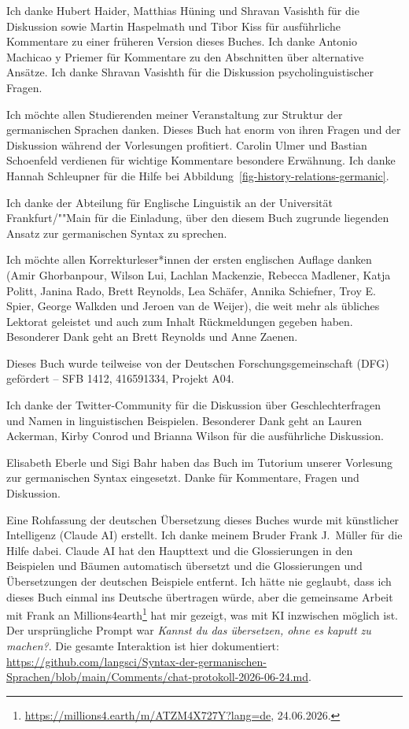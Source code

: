 \addchap{\lsAcknowledgementTitle}

Ich danke Hubert Haider, Matthias Hüning und Shravan Vasishth für die Diskussion sowie Martin Haspelmath und Tibor Kiss für ausführliche Kommentare
zu einer früheren Version dieses Buches. Ich danke Antonio Machicao y Priemer für Kommentare zu den Abschnitten
über alternative Ansätze. Ich danke Shravan Vasishth für die Diskussion psycholinguistischer Fragen.

Ich möchte allen Studierenden meiner Veranstaltung zur Struktur der germanischen Sprachen danken. Dieses Buch
hat enorm von ihren Fragen und der Diskussion während der Vorlesungen profitiert.
Carolin Ulmer %
und
Bastian Schoenfeld %
verdienen für wichtige Kommentare besondere Erwähnung. Ich danke Hannah Schleupner für die Hilfe bei Abbildung~\ref{fig-history-relations-germanic}.

Ich danke der Abteilung für Englische Linguistik an der Universität Frankfurt/""Main für die Einladung, über
den diesem Buch zugrunde liegenden Ansatz zur germanischen Syntax zu sprechen.

Ich möchte allen Korrekturleser*innen der ersten englischen Auf\/lage danken (Amir Ghorbanpour,
Wilson Lui,
Lachlan Mackenzie,
Rebecca Madlener,
Katja Politt,
Janina Rado,
Brett Reynolds,
Lea Schäfer,
Annika Schiefner,
Troy E. Spier,
George Walkden und
Jeroen van de Weijer), die weit mehr als
übliches Lektorat geleistet und auch zum Inhalt Rückmeldungen gegeben haben. Besonderer Dank geht an Brett Reynolds und Anne Zaenen.

Dieses Buch wurde teilweise von der Deutschen Forschungsgemeinschaft (DFG) gefördert – SFB 1412, 416591334, Projekt A04.

Ich danke der Twitter-Community für die Diskussion über Geschlechterfragen und Namen in linguistischen Beispielen. Besonderer Dank geht an Lauren Ackerman, Kirby Conrod und Brianna Wilson für die ausführliche Diskussion.


Elisabeth Eberle und Sigi Bahr haben das Buch im Tutorium unserer
Vorlesung zur germanischen Syntax eingesetzt. Danke für Kommentare, Fragen und Diskussion.

Eine Rohfassung der deutschen Übersetzung dieses Buches wurde mit künstlicher Intelligenz (Claude AI) erstellt. Ich danke meinem Bruder Frank
J.\ Müller für die Hilfe dabei. Claude AI hat den Haupttext und die Glossierungen in den Beispielen
und Bäumen automatisch übersetzt und die Glossierungen und Übersetzungen der deutschen Beispiele
entfernt. Ich hätte nie geglaubt, dass ich dieses Buch einmal ins Deutsche übertragen würde, aber
die gemeinsame Arbeit mit Frank an Millions4earth\footnote{
\url{https://millions4.earth/m/ATZM4X727Y?lang=de}, 24.06.2026.
} hat mir gezeigt, was mit KI inzwischen möglich ist. Der ursprüngliche Prompt war \emph{Kannst du das übersetzen, ohne es kaputt zu machen?}. Die
gesamte Interaktion ist hier dokumentiert: \url{https://github.com/langsci/Syntax-der-germanischen-Sprachen/blob/main/Comments/chat-protokoll-2026-06-24.md}.



